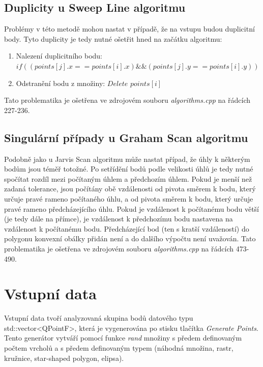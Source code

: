 \documentclass[a4paper,11pt,twoside]{article}
\begin{document}
\subsection{Duplicity u Sweep Line algoritmu}
Problémy v této metodě mohou nastat v případě, že na vstupu budou duplicitní body. Tyto duplicity je tedy nutné ošetřit hned na začátku algoritmu:
\begin{enumerate}
\item Nalezení duplicitního bodu:  $ if( (points[j].x == points[i].x) \&\& (points[j].y == points[i].y) )$ 
\item Odstranění bodu z množiny: $ Delete$ $ points[i]$
\end{enumerate}
Tato problematika je ošetřena ve zdrojovém souboru \textit{algorithms.cpp} na řádcích 227-236.

\subsection{Singulární případy u Graham Scan algoritmu}
Podobně jako u Jarvis Scan algoritmu může nastat případ, že úhly k některým bodům jsou téměř totožné. Po setřídění bodů podle velikosti úhlů je tedy nutné spočítat rozdíl mezi počítaným úhlem a předchozím úhlem. Pokud je menší než zadaná tolerance, jsou počítány obě vzdálenosti od pivota směrem k bodu, který určuje pravé rameno počítaného úhlu, a od pivota směrem k bodu, který určuje pravé rameno předcházejícího úhlu. Pokud je vzdálenost k počítanému bodu větší (je tedy dále na přímce), je vzdálenost k předchozímu bodu nastavena na vzdálenost k počítanému bodu. Předcházející bod (ten s kratší vzdáleností) do polygonu konvexní obálky přidán není a do dalšího výpočtu není uvažován.
Tato problematika je ošetřena ve zdrojovém souboru \textit{algorithms.cpp} na řádcích 473-490.


\newpage
{}

\vspace*{-1cm}
\section{Vstupní data}
Vstupní data tvoří analyzovaná skupina bodů datového typu std::vector<QPointF>, která je vygenerována po stisku tlačítka \textit{Generate Points}. Tento generátor vytváří pomocí funkce \textit{rand} množiny s předem definovaným počtem vrcholů a s předem definovaným typem (náhodná množina, rastr, kružnice, star-shaped polygon, elipsa).
\end{document}
